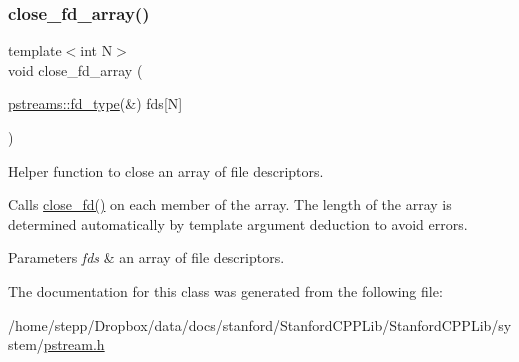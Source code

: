 \subsubsection{\texorpdfstring{close\+\_\+fd\+\_\+array()}{close\_fd\_array()}}
{\footnotesize\ttfamily template$<$int N$>$ \\
void close\+\_\+fd\+\_\+array (\begin{DoxyParamCaption}\item[{\mbox{\hyperlink{structredi_1_1pstreams_add0b7eaed16eb6c22a56012958d85b1d}{pstreams\+::fd\+\_\+type}}(\&)}]{fds\mbox{[}\+N\mbox{]} }\end{DoxyParamCaption})\hspace{0.3cm}{\ttfamily [related]}}



Helper function to close an array of file descriptors. 

Calls {\ttfamily \mbox{\hyperlink{classredi_1_1basic__pstreambuf_a1f07c96f98013de48578043f0caa0e82}{close\+\_\+fd()}}} on each member of the array. The length of the array is determined automatically by template argument deduction to avoid errors.


\begin{DoxyParams}{Parameters}
{\em fds} & an array of file descriptors. \\
\hline
\end{DoxyParams}


The documentation for this class was generated from the following file\+:\begin{DoxyCompactItemize}
\item 
/home/stepp/\+Dropbox/data/docs/stanford/\+Stanford\+C\+P\+P\+Lib/\+Stanford\+C\+P\+P\+Lib/system/\mbox{\hyperlink{pstream_8h}{pstream.\+h}}\end{DoxyCompactItemize}
